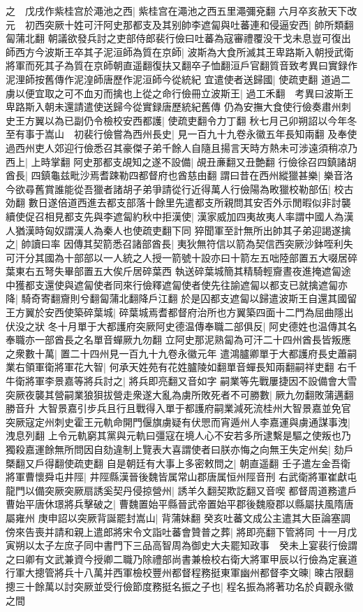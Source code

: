 之　戊戌作紫桂宫於澠池之西|{
	紫桂宫在澠池之西五里澠彌兗翻}
六月卒亥赦天下改元　初西突厥十姓可汗阿史那都支及其别帥李遮匐與吐蕃連和侵逼安西|{
	帥所類翻匐蒲北翻}
朝議欲發兵討之吏部侍郎裴行儉曰吐蕃為寇審禮覆没干戈未息豈可復出師西方今波斯王卒其子泥洹師為質在京師|{
	波斯為大食所滅其王卑路斯入朝授武衛將軍而死其子為質在京師朝直遥翻復扶又翻卒子恤翻洹戶官翻質音致考異曰實録作泥浬師按舊傳作泥湟師唐歷作泥洹師今從統紀}
宜遣使者送歸國|{
	使疏吏翻}
道過二虜以便宜取之可不血刃而擒也上從之命行儉冊立波斯王|{
	過工禾翻　考異曰波斯王卑路斯入朝未還請遣使送歸今從實録唐歷統紀舊傳}
仍為安撫大食使行儉奏肅州刺史王方翼以為已副仍令檢校安西都護|{
	使疏吏翻令力丁翻}
秋七月己卯朔詔以今年冬至有事于嵩山　初裴行儉嘗為西州長史|{
	見一百九十九卷永徽五年長知兩翻}
及奉使過西州吏人郊迎行儉悉召其豪傑子弟千餘人自隨且揚言天時方熱未可涉遠須稍凉乃西上|{
	上時掌翻}
阿史那都支覘知之遂不設備|{
	覘丑亷翻又丑艶翻}
行儉徐召四鎮諸胡酋長|{
	四鎮龜兹毗沙焉耆踈勒四都督府也酋慈由翻}
謂曰昔在西州縱獵甚樂|{
	樂音洛}
今欲尋舊賞誰能從吾獵者諸胡子弟爭請從行近得萬人行儉陽為畋獵校勒部伍|{
	校古効翻}
數日遂倍道西進去都支部落十餘里先遣都支所親問其安否外示閒暇似非討襲續使促召相見都支先與李遮匐約秋中拒漢使|{
	漢家威加四夷故夷人率謂中國人為漢人猶漢時匈奴謂漢人為秦人也使疏吏翻下同}
猝聞軍至計無所出帥其子弟迎謁遂擒之|{
	帥讀曰率}
因傳其契箭悉召諸部酋長|{
	夷狄無符信以箭為契信西突厥沙鉢咥利失可汗分其國為十部部以一人統之人授一箭號十設亦曰十箭左五咄陸部置五大啜居碎葉東右五弩失畢部置五大俟斤居碎葉西}
執送碎葉城簡其精騎輕齎晝夜進掩遮匐途中獲都支還使與遮匐使者同來行儉釋遮匐使者使先往諭遮匐以都支已就擒遮匐亦降|{
	騎奇寄翻齎則兮翻匐蒲北翻降戶江翻}
於是囚都支遮匐以歸遣波斯王自還其國留王方翼於安西使築碎葉城|{
	碎葉城焉耆都督府治所也方翼築四面十二門為屈曲隱出伏没之狀}
冬十月單于大都護府突厥阿史德温傳奉職二部俱反|{
	阿史德姓也温傳其名奉職亦一部酋長之名單音蟬厥九勿翻}
立阿史那泥熟匐為可汗二十四州酋長皆叛應之衆數十萬|{
	置二十四州見一百九十九卷永徽元年}
遣鴻臚卿單于大都護府長史蕭嗣業右領軍衛將軍花大智|{
	何承天姓苑有花姓臚陵如翻單音蟬長知兩翻嗣祥吏翻}
右千牛衛將軍李景嘉等將兵討之|{
	將兵即亮翻又音如字}
嗣業等先戰屢捷因不設備會大雪突厥夜襲其營嗣業狼狽拔營走衆遂大亂為虜所敗死者不可勝數|{
	厥九勿翻敗蒲邁翻勝音升}
大智景嘉引步兵且行且戰得入單于都護府嗣業減死流桂州大智景嘉並免官突厥寇定州刺史霍王元軌命開門偃旗虜疑有伏愳而宵遁州人李嘉運與虜通謀事洩|{
	洩息列翻}
上令元軌窮其黨與元軌曰彊寇在境人心不安若多所逮繫是驅之使叛也乃獨殺嘉運餘無所問因自劾違制上覽表大喜謂使者曰朕亦悔之向無王失定州矣|{
	劾戶槩翻又戶得翻使疏吏翻}
自是朝廷有大事上多密敕問之|{
	朝直遥翻}
壬子遣左金吾衛將軍曹懷舜屯井陘|{
	井陘縣漢晉後魏皆属常山郡唐属恒州陘音刑}
右武衛將軍崔獻屯龍門以備突厥突厥扇誘奚契丹侵掠營州|{
	誘羊久翻契欺訖翻又音喫}
都督周道務遣戶曹始平唐休璟將兵擊破之|{
	曹魏置始平縣晉武帝置始平郡後魏廢郡以縣屬扶風隋唐屬雍州}
庚申詔以突厥背誕罷封嵩山|{
	背蒲妹翻}
癸亥吐蕃文成公主遣其大臣論塞調傍來告喪并請和親上遣郎將宋令文詣吐蕃會贊普之葬|{
	將即亮翻下管將同}
十一月戊寅朔以太子左庶子同中書門下三品高智周為御史大夫罷知政事　癸未上宴裴行儉謂之曰卿有文武兼資今授卿二職乃除禮部尚書兼檢校右衛大將軍甲辰以行儉為定襄道行軍大摠管將兵十八萬并西軍檢校豐州都督程務挺東軍幽州都督李文暕|{
	暕古限翻}
摠三十餘萬以討突厥並受行儉節度務挺名振之子也|{
	程名振為將著功名於貞觀永徽之間}


